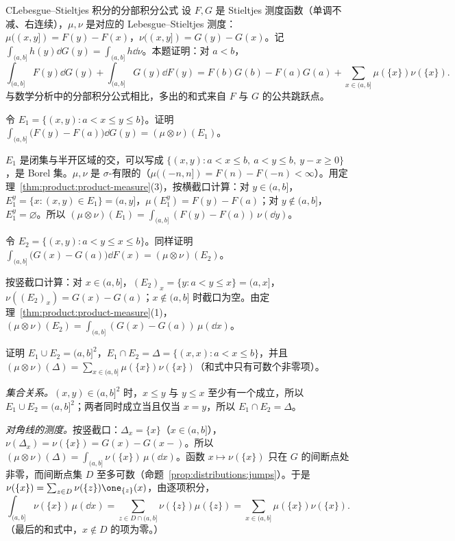 \begin{probleme}{C}{Lebesgue--Stieltjes 积分的分部积分公式}
设 $F,G$ 是 Stieltjes 测度函数（单调不减、右连续），$\mu,\nu$ 是对应的 Lebesgue--Stieltjes 测度：$\mu((x,y])=F(y)-F(x)$，$\nu((x,y])=G(y)-G(x)$。记 $\int_{(a,b]}h(y)\dd G(y)=\int_{(a,b]}h\dd\nu$。本题证明：对 $a<b$，
\[
\int_{(a,b]}F(y)\dd G(y)+\int_{(a,b]}G(y)\dd F(y)=F(b)G(b)-F(a)G(a)+\sum_{x\in(a,b]}\mu(\{x\})\nu(\{x\}).
\]
与数学分析中的分部积分公式相比，多出的和式来自 $F$ 与 $G$ 的公共跳跃点。
\begin{questions}
\item 令 $E_1=\{(x,y):a<x\leqslant y\leqslant b\}$。证明 $\int_{(a,b]}\bigl(F(y)-F(a)\bigr)\dd G(y)=(\mu\otimes\nu)(E_1)$。
\begin{solution}
$E_1$ 是闭集与半开区域的交，可以写成 $\{(x,y):a<x\leqslant b,\ a<y\leqslant b,\ y-x\geqslant0\}$，是 Borel 集。$\mu,\nu$ 是 $\sigma$-有限的（$\mu((-n,n])=F(n)-F(-n)<\infty$）。用定理~\ref{thm:product:product-measure}(3)，按横截口计算：对 $y\in(a,b]$，$E_1^y=\{x:(x,y)\in E_1\}=(a,y]$，$\mu(E_1^y)=F(y)-F(a)$；对 $y\notin(a,b]$，$E_1^y=\varnothing$。所以 $(\mu\otimes\nu)(E_1)=\int_{(a,b]}(F(y)-F(a))\,\nu(\dd y)$。
\end{solution}

\item 令 $E_2=\{(x,y):a<y\leqslant x\leqslant b\}$。同样证明 $\int_{(a,b]}\bigl(G(x)-G(a)\bigr)\dd F(x)=(\mu\otimes\nu)(E_2)$。
\begin{solution}
按竖截口计算：对 $x\in(a,b]$，$(E_2)_x=\{y:a<y\leqslant x\}=(a,x]$，$\nu((E_2)_x)=G(x)-G(a)$；$x\notin(a,b]$ 时截口为空。由定理~\ref{thm:product:product-measure}(1)，$(\mu\otimes\nu)(E_2)=\int_{(a,b]}(G(x)-G(a))\,\mu(\dd x)$。
\end{solution}

\item 证明 $E_1\cup E_2=(a,b]^2$，$E_1\cap E_2=\Delta=\{(x,x):a<x\leqslant b\}$，并且 $(\mu\otimes\nu)(\Delta)=\sum_{x\in(a,b]}\mu(\{x\})\nu(\{x\})$（和式中只有可数个非零项）。
\begin{solution}
\emph{集合关系。}$(x,y)\in(a,b]^2$ 时，$x\leqslant y$ 与 $y\leqslant x$ 至少有一个成立，所以 $E_1\cup E_2=(a,b]^2$；两者同时成立当且仅当 $x=y$，所以 $E_1\cap E_2=\Delta$。

\emph{对角线的测度。}按竖截口：$\Delta_x=\{x\}$（$x\in(a,b]$），$\nu(\Delta_x)=\nu(\{x\})=G(x)-G(x-)$。所以 $(\mu\otimes\nu)(\Delta)=\int_{(a,b]}\nu(\{x\})\,\mu(\dd x)$。函数 $x\mapsto\nu(\{x\})$ 只在 $G$ 的间断点处非零，而间断点集 $D$ 至多可数（命题~\ref{prop:distributions:jumps}）。于是 $\nu(\{x\})=\sum_{z\in D}\nu(\{z\})\one_{\{z\}}(x)$，由逐项积分，
\[
\int_{(a,b]}\nu(\{x\})\,\mu(\dd x)=\sum_{z\in D\cap(a,b]}\nu(\{z\})\mu(\{z\})=\sum_{x\in(a,b]}\mu(\{x\})\nu(\{x\}).
\]
（最后的和式中，$x\notin D$ 的项为零。）
\end{solution}


\end{questions}
\end{probleme}
